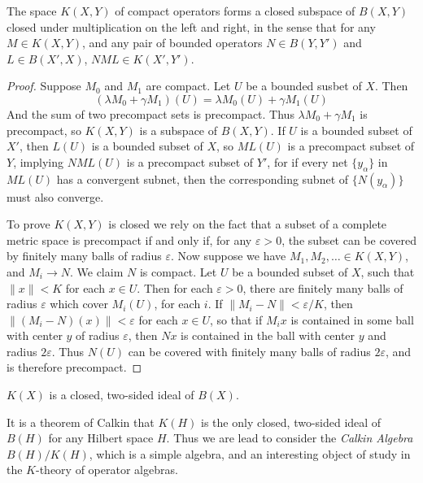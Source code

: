 \begin{theorem}
    The space $K(X,Y)$ of compact operators forms a closed subspace of $B(X,Y)$ closed under multiplication on the left and right, in the sense that for any $M \in K(X,Y)$, and any pair of bounded operators $N \in B(Y,Y')$ and $L \in B(X',X)$, $NML \in K(X',Y')$.
\end{theorem}
\begin{proof}
    Suppose $M_0$ and $M_1$ are compact. Let $U$ be a bounded susbet of $X$. Then
    \[ (\lambda M_0 + \gamma M_1)(U) = \lambda M_0(U) + \gamma M_1(U) \]
    And the sum of two precompact sets is precompact. Thus $\lambda M_0 + \gamma M_1$ is precompact, so $K(X,Y)$ is a subspace of $B(X,Y)$. If $U$ is a bounded subset of $X'$, then $L(U)$ is a bounded subset of $X$, so $ML(U)$ is a precompact subset of $Y$, implying $NML(U)$ is a precompact subset of $Y'$, for if every net $\{ y_\alpha \}$ in $ML(U)$ has a convergent subnet, then the corresponding subnet of $\{ N(y_\alpha) \}$ must also converge.

    To prove $K(X,Y)$ is closed we rely on the fact that a subset of a complete metric space is precompact if and only if, for any $\varepsilon > 0$, the subset can be covered by finitely many balls of radius $\varepsilon$. Now suppose we have $M_1, M_2, \dots \in K(X,Y)$, and $M_i \to N$. We claim $N$ is compact. Let $U$ be a bounded subset of $X$, such that $\| x \| < K$ for each $x \in U$. Then for each $\varepsilon > 0$, there are finitely many balls of radius $\varepsilon$ which cover $M_i(U)$, for each $i$. If $\| M_i - N \| < \varepsilon / K$, then $\| (M_i - N)(x) \| < \varepsilon$ for each $x \in U$, so that if $M_i x$ is contained in some ball with center $y$ of radius $\varepsilon$, then $Nx$ is contained in the ball with center $y$ and radius $2 \varepsilon$. Thus $N(U)$ can be covered with finitely many balls of radius $2\varepsilon$, and is therefore precompact.
\end{proof}

\begin{corollary}
    $K(X)$ is a closed, two-sided ideal of $B(X)$.
\end{corollary}

\begin{remark}
    It is a theorem of Calkin that $K(H)$ is the only closed, two-sided ideal of $B(H)$ for any Hilbert space $H$. Thus we are lead to consider the \emph{Calkin Algebra} $B(H)/K(H)$, which is a simple algebra, and an interesting object of study in the $K$-theory of operator algebras.
\end{remark}

